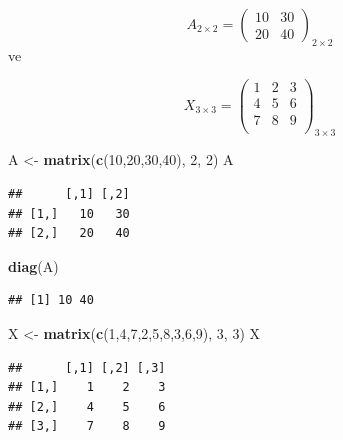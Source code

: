 \documentclass[
]{book}
\newenvironment{Shaded}{\begin{snugshade}}{\end{snugshade}}
\newcommand{\DecValTok}[1]{\textcolor[rgb]{0.00,0.00,0.81}{#1}}
\newcommand{\FunctionTok}[1]{\textcolor[rgb]{0.13,0.29,0.53}{\textbf{#1}}}
\newcommand{\NormalTok}[1]{#1}
\newcommand{\OtherTok}[1]{\textcolor[rgb]{0.56,0.35,0.01}{#1}}
\begin{document}
\[A_{2×2} =
  \begin{pmatrix}
10 & 30 \\
20 & 40  
\end{pmatrix}_{2×2}\]
ve

\[X_{3×3} =
  \begin{pmatrix}
1 & 2 & 3 \\
4 & 5 & 6 \\
7 & 8 & 9 \\
\end{pmatrix}_{3×3}\]

\begin{Shaded}
\begin{Highlighting}[]
\NormalTok{A }\OtherTok{\textless{}{-}} \FunctionTok{matrix}\NormalTok{(}\FunctionTok{c}\NormalTok{(}\DecValTok{10}\NormalTok{,}\DecValTok{20}\NormalTok{,}\DecValTok{30}\NormalTok{,}\DecValTok{40}\NormalTok{), }\DecValTok{2}\NormalTok{, }\DecValTok{2}\NormalTok{) }
\NormalTok{A }
\end{Highlighting}
\end{Shaded}

\begin{verbatim}
##      [,1] [,2]
## [1,]   10   30
## [2,]   20   40
\end{verbatim}

\begin{Shaded}
\begin{Highlighting}[]
\FunctionTok{diag}\NormalTok{(A)}
\end{Highlighting}
\end{Shaded}

\begin{verbatim}
## [1] 10 40
\end{verbatim}

\begin{Shaded}
\begin{Highlighting}[]
\NormalTok{X }\OtherTok{\textless{}{-}} \FunctionTok{matrix}\NormalTok{(}\FunctionTok{c}\NormalTok{(}\DecValTok{1}\NormalTok{,}\DecValTok{4}\NormalTok{,}\DecValTok{7}\NormalTok{,}\DecValTok{2}\NormalTok{,}\DecValTok{5}\NormalTok{,}\DecValTok{8}\NormalTok{,}\DecValTok{3}\NormalTok{,}\DecValTok{6}\NormalTok{,}\DecValTok{9}\NormalTok{), }\DecValTok{3}\NormalTok{, }\DecValTok{3}\NormalTok{) }
\NormalTok{X }
\end{Highlighting}
\end{Shaded}

\begin{verbatim}
##      [,1] [,2] [,3]
## [1,]    1    2    3
## [2,]    4    5    6
## [3,]    7    8    9
\end{verbatim}
\end{document}
